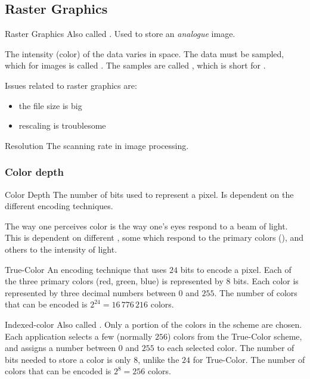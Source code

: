 \documentclass[\main/notes.tex]{subfiles}
\begin{document}
			\subsection{Raster Graphics}
				\begin{definition}{Raster Graphics}
					Also called . Used to store an \emph{analogue} image.
					\begin{indentparagraph}
						The intensity (color) of the data varies in space. The data must be sampled, which for images is called . The samples are called , which is short for .
					\end{indentparagraph}
				\end{definition}
				Issues related to raster graphics are:
				\begin{itemize}[nosep]
					\item the file size is big
					\item rescaling is troublesome
				\end{itemize}
				\begin{definition}{Resolution}
					The scanning rate in image processing.
				\end{definition}
				\subsubsection{Color depth}
					\begin{definition}{Color Depth}
						The number of bits used to represent a pixel. Is dependent on the different encoding techniques.
						\begin{indentparagraph}
							The way one perceives color is the way one's eyes respond to a beam of light. This is dependent on different , some which respond to the primary colors (), and others to the intensity of light.
						\end{indentparagraph}
					\end{definition}
					\pagebreak
					\begin{definition}{True-Color}
						An encoding technique that uses $24$ bits to encode a pixel. Each of the three primary colors (red, green, blue) is represented by $8$ bits. Each color is represented by three decimal numbers between $0$ and $255$. The number of colors that can be encoded is $2^{24} = 16\,776\,216$ colors.
					\end{definition}
					\begin{definition}{Indexed-color}
						Also called . Only a portion of the colors in the  scheme are chosen. Each application selects a few (normally $256$) colors from the True-Color scheme, and assigns a number between $0$ and $255$ to each selected color. The number of bits needed to store a color is only $8$, unlike the $24$ for True-Color. The number of colors that can be encoded is $2^{8} = 256$ colors.
					\end{definition}
\end{document}
